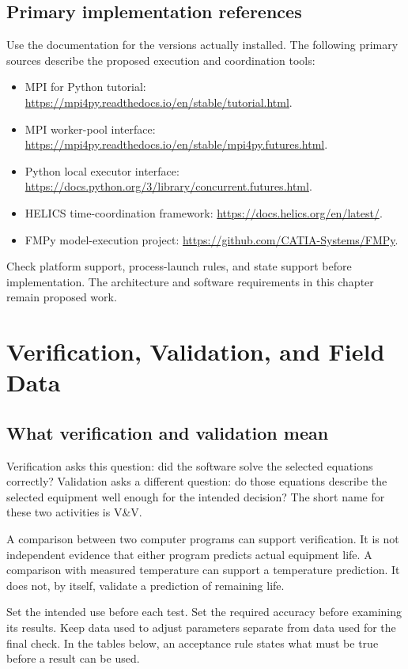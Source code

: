 \documentclass[11pt,a4paper]{report}
\begin{document}
\section{Primary implementation references}
Use the documentation for the versions actually installed.
The following primary sources describe the proposed execution and coordination tools:
\begin{itemize}
\item MPI for Python tutorial: \url{https://mpi4py.readthedocs.io/en/stable/tutorial.html}.
\item MPI worker-pool interface: \url{https://mpi4py.readthedocs.io/en/stable/mpi4py.futures.html}.
\item Python local executor interface: \url{https://docs.python.org/3/library/concurrent.futures.html}.
\item HELICS time-coordination framework: \url{https://docs.helics.org/en/latest/}.
\item FMPy model-execution project: \url{https://github.com/CATIA-Systems/FMPy}.
\end{itemize}
Check platform support, process-launch rules, and state support before implementation.
The architecture and software requirements in this chapter remain proposed work.

\chapter{Verification, Validation, and Field Data}
\label{chap:validation}

\section{What verification and validation mean}
Verification asks this question: did the software solve the selected equations correctly?
Validation asks a different question: do those equations describe the selected equipment well enough for the intended decision?
The short name for these two activities is V\&V.

A comparison between two computer programs can support verification.
It is not independent evidence that either program predicts actual equipment life.
A comparison with measured temperature can support a temperature prediction.
It does not, by itself, validate a prediction of remaining life.

Set the intended use before each test.
Set the required accuracy before examining its results.
Keep data used to adjust parameters separate from data used for the final check.
In the tables below, an acceptance rule states what must be true before a result can be used.
\end{document}
